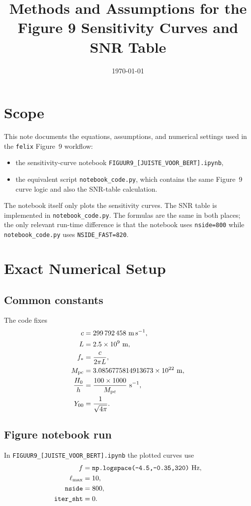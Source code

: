 \documentclass[11pt]{article}
\title{Methods and Assumptions for the Figure 9 Sensitivity Curves and SNR Table}
\author{}
\date{\today}
\begin{document}
\maketitle

\section{Scope}
This note documents the equations, assumptions, and numerical settings used in the \texttt{felix} Figure~9 workflow:
\begin{itemize}
\item the sensitivity-curve notebook \texttt{FIGUUR9\_[JUISTE\_VOOR\_BERT].ipynb},
\item the equivalent script \texttt{notebook\_code.py}, which contains the same Figure~9 curve logic and also the SNR-table calculation.
\end{itemize}

The notebook itself only plots the sensitivity curves. The SNR table is implemented in \texttt{notebook\_code.py}. The formulas are the same in both places; the only relevant run-time difference is that the notebook uses \texttt{nside=800} while \texttt{notebook\_code.py} uses \texttt{NSIDE\_FAST=820}.

\section{Exact Numerical Setup}
\subsection{Common constants}
The code fixes
\begin{align}
c &= 299\,792\,458~\mathrm{m\,s^{-1}}, \\
L &= 2.5\times 10^9~\mathrm{m}, \\
f_* &= \frac{c}{2\pi L}, \\
M_{\rm pc} &= 3.0856775814913673\times 10^{22}~\mathrm{m}, \\
\frac{H_0}{h} &= \frac{100\times 1000}{M_{\rm pc}}~\mathrm{s^{-1}}, \\
Y_{00} &= \frac{1}{\sqrt{4\pi}}.
\end{align}

\subsection{Figure notebook run}
In \texttt{FIGUUR9\_[JUISTE\_VOOR\_BERT].ipynb} the plotted curves use
\begin{align}
f &= \text{\texttt{np.logspace(-4.5,-0.35,320)}}~\mathrm{Hz}, \\
\ell_{\max} &= 10, \\
\text{\texttt{nside}} &= 800, \\
\text{\texttt{iter\_sht}} &= 0.
\end{align}
\end{document}
